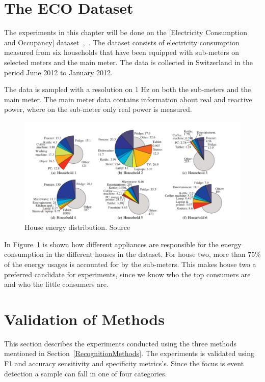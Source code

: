 \section{The ECO Dataset}
The experiments in this chapter will be done on the [Electricity Consumption and Occupancy] dataset~\citep{RefWorks:26},~\citep{RefWorks:27}. The dataset consists of electricity consumption measured from six households that have been equipped with sub-meters on selected meters and the main meter. The data is collected in Switzerland in the period June 2012 to January 2012. 

The data is sampled with a resolution on 1 Hz on both the sub-meters and the main meter. The main meter data contains information about real and reactive power, where on the sub-meter only real power is measured. 

\begin{figure}[H]
\centering
\includegraphics[width=1\textwidth]{billeder/ECOHouses.png}
\caption[House energy distribution.]{House energy distribution. Source \citep{RefWorks:26}}
\label{fig:EHD}
\end{figure}

In Figure~\ref{fig:EHD} is shown how different appliances are responsible for the energy consumption in the different houses in the  dataset. For house two, more than $75\%$ of the energy usages is accounted for by the sub-meters. This makes house two a preferred candidate for experiments, since we know who the top consumers are and who the little consumers are.  

\section{Validation of Methods} 
\label{sec:VOM}
This section describes the experiments conducted using the three methods mentioned in Section~\ref{RecognitionMethods}. The experiments is validated using F1 and accuracy sensitivity and specificity metrics's. Since the focus is event detection a sample can fall in one of four categories. 

